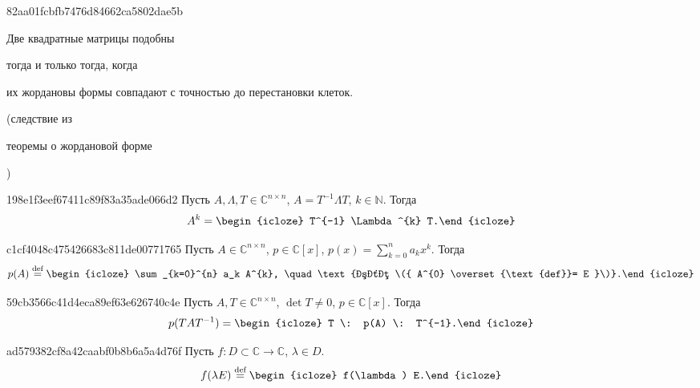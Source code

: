 \begin{note}{82aa01fcbfb7476d84662ca5802dae5b}
    \begin{icloze}{2}Две квадратные матрицы подобны\end{icloze} \begin{icloze}{3}тогда и только тогда, когда\end{icloze} \begin{icloze}{1}их жордановы формы совпадают с точностью до перестановки клеток.\end{icloze}

    \begin{center}
        \tiny (следствие из \begin{icloze}{4}теоремы о жордановой форме\end{icloze})
    \end{center}
\end{note}

\begin{note}{198e1f3eef67411c89f83a35ade066d2}
    Пусть \( A, \Lambda, T \in \mathbb C^{n \times n} \),\: \( A = T^{-1} \Lambda T \),\: \( k \in \mathbb N \). Тогда
    \[
        A^{k} = \begin{icloze}{1}T^{-1} \Lambda^{k} T.\end{icloze}
    \]
\end{note}

\begin{note}{c1cf4048c475426683c811de00771765}
    Пусть \({ A \in \mathbb C^{n \times n} }\),\: \({ p \in \mathbb C[x] }\),\: \( \displaystyle p(x) = \sum_{k=0}^{n} a_k x^{k}. \)
    Тогда
    \[
        p(A) \overset{\text{def}}= \begin{icloze}{1}\sum_{k=0}^{n} a_k A^{k}, \quad \text{где \({ A^{0} \overset{\text{def}}= E }\)}.\end{icloze}
    \]
\end{note}

\begin{note}{59cb3566c41d4eca89ef63e626740c4e}
    Пусть \({ A, T \in \mathbb C^{n \times n} }\),\: \({ \det T \neq 0 }\),\: \({ p \in \mathbb C[x] }\). Тогда
    \[
        p(T A T^{-1}) = \begin{icloze}{1}T \: p(A) \: T^{-1}.\end{icloze}
    \]
\end{note}

\begin{note}{ad579382cf8a42caabf0b8b6a5a4d76f}
    Пусть \({ f : D \subset \mathbb C \to \mathbb C }\), \({ \lambda \in D }\).
    \[
        f(\lambda E) \overset{\text{def}}= \begin{icloze}{1}f(\lambda) E.\end{icloze}
    \]
\end{note}

